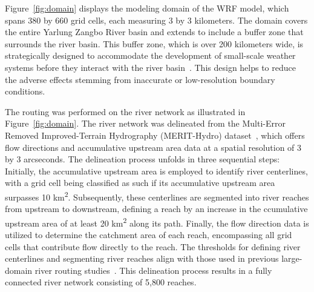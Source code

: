 \documentclass[draft]{agujournal2019}
\begin{document}
Figure~\ref{fig:domain} displays the modeling domain of the WRF model, which spans 380 by 660 grid cells, each measuring 3 by 3 kilometers. The domain covers the entire Yarlung Zangbo River basin and extends to include a buffer zone that surrounds the river basin. This buffer zone, which is over 200 kilometers wide, is strategically designed to accommodate the development of small-scale weather systems before they interact with the river basin~\cite{denis2002CD}. This design helps to reduce the adverse effects stemming from inaccurate or low-resolution boundary conditions.

The routing was performed on the river network as illustrated in Figure~\ref{fig:domain}. The river network was delineated from the Multi-Error Removed Improved-Terrain Hydrography (MERIT-Hydro) dataset~\cite{yamazaki2017GRL, yamazaki2019WRR}, which offers flow directions and accumulative upstream area data at a spatial resolution of 3 by 3 arcseconds. The delineation process unfolds in three sequential steps: Initially, the accumulative upstream area is employed to identify river centerlines, with a grid cell being classified as such if its accumulative upstream area surpasses 10 km\textsuperscript{2}. Subsequently, these centerlines are segmented into river reaches from upstream to downstream, defining a reach by an increase in the ccumulative upstream area of at least 20 km\textsuperscript{2} along its path. Finally, the flow direction data is utilized to determine the catchment area of each reach, encompassing all grid cells that contribute flow directly to the reach. The thresholds for defining river centerlines and segmenting river reaches align with those used in previous large-domain river routing studies~\cite{lin2021SD, lin2019WRR}. This delineation process results in a fully connected river network consisting of 5,800 reaches.
\end{document}
